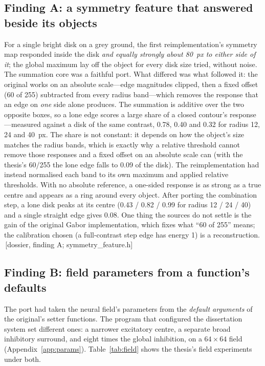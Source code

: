 \documentclass[11pt,a4paper]{article}
\newcommand{\src}[1]{\textcolor{blue!50!black}{\footnotesize\,[#1]}}
\newcommand{\src}[1]{}
\begin{document}
\subsection{Finding A: a symmetry feature that answered beside its objects}
\label{sec:findingA}
For a single bright disk on a grey ground, the first reimplementation's symmetry
map responded inside the disk \emph{and equally strongly about 80~px to either
side of it}; the global maximum lay off the object for every disk size tried,
without noise. The summation core was a faithful port. What differed was what
followed it: the original works on an absolute scale---edge magnitudes clipped,
then a fixed offset (60 of 255) subtracted from every radius band---which removes
the response that an edge on \emph{one} side alone produces. The summation is
additive over the two opposite boxes, so a lone edge scores a large share of a
closed contour's response---measured against a disk of the same contrast, 0.78,
0.40 and 0.32 for radius 12, 24 and 40~px. The share is not constant: it depends
on how the object's size matches the radius bands, which is exactly why a
relative threshold cannot remove those responses and a fixed offset on an
absolute scale can (with the thesis's 60/255 the lone edge falls to 0.09 of the
disk). The reimplementation had instead normalised each band to its
own maximum and applied relative thresholds. With no absolute reference, a
one-sided response is as strong as a true centre and appears as a ring around
every object. After porting the combination step, a lone disk peaks at its centre
(0.43 / 0.82 / 0.99 for radius 12 / 24 / 40) and a single straight edge gives
0.08. One thing the sources do not settle is the gain of the original Gabor
implementation, which fixes what ``60 of 255'' means; the calibration chosen (a
full-contrast step edge has energy 1) is a reconstruction.
\src{dossier, finding A; symmetry\_feature.h}

\subsection{Finding B: field parameters from a function's defaults}
\label{sec:findingB}
The port had taken the neural field's parameters from the \emph{default
arguments} of the original's setter functions. The program that configured the
dissertation system set different ones: a narrower excitatory centre, a separate
broad inhibitory surround, and eight times the global inhibition, on a
$64\times64$ field (Appendix~\ref{app:params}). Table~\ref{tab:field} shows the
thesis's field experiments \citep[published in English as][]{backer2002} under both.
\end{document}
